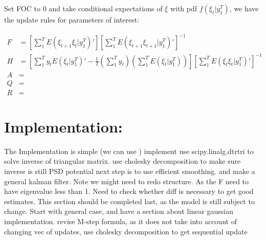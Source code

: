 \documentclass[12pt]{article}
\numberwithin{equation}{section}
\begin{document}
Set FOC to 0 and take conditional expectations of $\xi$ with pdf $f(\xi_t|y_1^T)$, we have the update rules for parameters of interest:

\begin{align}
    F &= \left[\sum_1^{T}E(\xi_{t+1}\xi_{t}|y_1^T)'\right] \left[\sum_1^{T}E(\xi_{t+1}\xi_{t+1}|y_1^T)'\right]^{-1} \\
    H &= \left[\sum_1^{T}y_tE(\xi_{t}|y_1^T)' - \frac{1}{T}\left(\sum_1^Ty_t\right)\left(\sum_1^TE(\xi_t|y_1^T)\right)\right] 
    \left[\sum_1^{T}E(\xi_{t}\xi_{t}|y_1^T)'\right]^{-1} \\
    A &= \\
    Q &= \\
    R &= 
\end{align}
\section{Implementation:} \label{sec:implement}
The Implementation is simple (we can use )
implement
use scipy.linalg.dtrtri to solve inverse of triangular matrix.
use cholesky decomposition to make sure inverse is still PSD
potential next step is to use efficient smoothing.
and make a general kalman filter. 
Note we might need to redo structure. As the F need to have eigenvalue less than 1. Need to check whether diff is necessary to get good estimates. This section should be completed last, as the model is still subject to change.
Start with general case, and have a section about linear gaussian implementation.
revise M-step formula, as it does not take into account of changing vec of updates, use cholesky decomposition to get sequential update 
\end{document}
